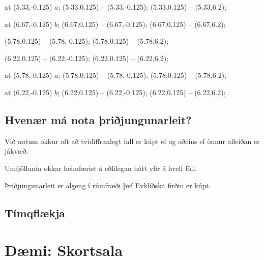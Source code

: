 {{{             at (5.33,-0.125) {$a$};
            (5.33,0.125) -- (5.33,-0.125);
             (5.33,0.125) -- (5.33,6.2);

             at (6.67,-0.125) {$b$};
            (6.67,0.125) -- (6.67,-0.125);
             (6.67,0.125) -- (6.67,6.2);

            (5.78,0.125) -- (5.78,-0.125);
             (5.78,0.125) -- (5.78,6.2);

            (6.22,0.125) -- (6.22,-0.125);
             (6.22,0.125) -- (6.22,6.2);

             at (5.78,-0.125) {$a$};
            (5.78,0.125) -- (5.78,-0.125);
             (5.78,0.125) -- (5.78,6.2);

             at (6.22,-0.125) {$b$};
            (6.22,0.125) -- (6.22,-0.125);
             (6.22,0.125) -- (6.22,6.2);
        }
    }
}

\subsection{Hvenær má nota þriðjungunarleit?}
{
    {
        \item<1-> Við notum okkur oft að tvídiffranlegt fall er kúpt ef og aðeins ef önnur afleiðan er jákvæð.
        \item<2-> Umfjöllunin okkar heimfærist á eðlilegan hátt yfir á hvelf föll.
        \item<3-> Þriðjungunarleit er algeng í rúmfræði því Evklíðska firðin er kúpt.
    }
}

\subsection{Tímqflækja}
{
}

\section{Dæmi: Skortsala}
